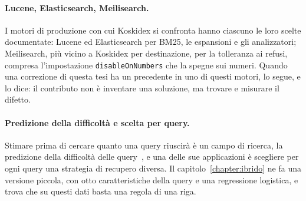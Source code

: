\paragraph{Lucene, Elasticsearch, Meilisearch.} I motori di produzione con cui
Koskidex si confronta hanno ciascuno le loro scelte documentate: Lucene ed
Elasticsearch per BM25, le espansioni e gli analizzatori; Meilisearch, più
vicino a Koskidex per destinazione, per la tolleranza ai refusi, compresa
l'impostazione \texttt{disableOnNumbers} che la spegne sui numeri. Quando una correzione
di questa tesi ha un precedente in uno di questi motori, lo segue, e lo dice: il
contributo non è inventare una soluzione, ma trovare e misurare il difetto.

\paragraph{Predizione della difficoltà e scelta per query.} Stimare prima di
cercare quanto una query riuscirà è un campo di ricerca, la predizione della
difficoltà delle query~\cite{cronentownsend2002,carmel2010qpp}, e una delle sue
applicazioni è scegliere per ogni query una strategia di recupero diversa. Il
capitolo~\ref{chapter:ibrido} ne fa una versione piccola, con otto
caratteristiche della query e una regressione logistica, e trova che su questi
dati basta una regola di una riga.
